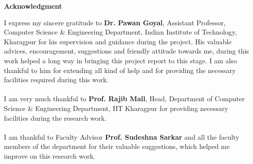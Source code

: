 \documentclass[a4paper,11pt,twoside,openright]{report}
\begin{document}
\begin{center}
{\bf \Large{Acknowledgment}}
\end{center}
\vspace{20pt}
I express my sincere gratitude to \textbf{ Dr. Pawan Goyal}, Assistant Professor, Computer Science \& Engineering Department, Indian Institute of Technology, Kharagpur for his supervision and guidance during the project. His valuable advices, encouragement, suggestions and friendly attitude towards me, during this work helped a long way in bringing this project report to this stage. I am also thankful to him for extending all kind of help and for providing the necessary facilities required during this work. \\ \\
I am very much thankful to \textbf{Prof. Rajib Mall}, Head, Department of Computer Science \& Engineering Department, IIT Kharagpur for providing necessary facilities during the research work. \\ \\
I am thankful to Faculty Advisor \textbf {Prof. Sudeshna Sarkar} and all the faculty members of the department for their valuable suggestions, which helped me improve on this research work.\\ \\
\end{document}
